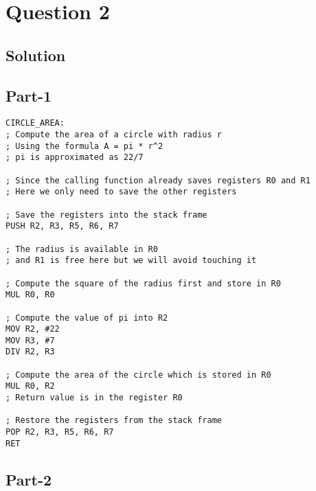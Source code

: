 \section*{Question 2}

\subsection*{Solution}

\subsection*{Part-1}

\begin{lstlisting}[language={[x86masm]Assembler}, frame=single, caption={Computing circle area in assembly}]
CIRCLE_AREA:
; Compute the area of a circle with radius r
; Using the formula A = pi * r^2
; pi is approximated as 22/7

; Since the calling function already saves registers R0 and R1
; Here we only need to save the other registers

; Save the registers into the stack frame
PUSH R2, R3, R5, R6, R7

; The radius is available in R0
; and R1 is free here but we will avoid touching it

; Compute the square of the radius first and store in R0
MUL R0, R0

; Compute the value of pi into R2
MOV R2, #22
MOV R3, #7
DIV R2, R3

; Compute the area of the circle which is stored in R0
MUL R0, R2
; Return value is in the register R0

; Restore the registers from the stack frame
POP R2, R3, R5, R6, R7
RET
\end{lstlisting}

\subsection*{Part-2}
